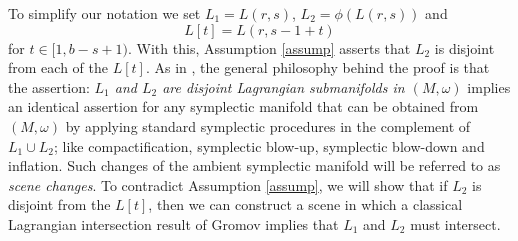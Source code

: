 \documentclass[12pt]{amsart}
\newtheorem{lemma}[theorem]{Lemma}
\theoremstyle{definition}
\begin{document}
To simplify our notation we set $L_1=L(r,s)$, $L_2= \phi(L(r,s))$ and $$L[t] = L(r, s-1+t)$$ for $t \in [1,b-s+1)$. With this, Assumption \ref{assump} asserts that $L_2$ is  disjoint from each of the $L[t]$. As in \cite{hiker}, the general philosophy behind the proof is that the assertion: {\em $L_1$ and $L_2$ are disjoint Lagrangian submanifolds in $(M,\omega)$} implies an identical assertion for any symplectic manifold that can be obtained from $(M,\omega)$ by applying standard symplectic procedures in the complement of $L_1 \cup L_2$; like compactification, symplectic blow-up, symplectic blow-down and inflation. Such changes of the ambient symplectic manifold will be referred to as {\em scene changes}. To contradict Assumption \ref{assump}, we will show that if $L_2$ is disjoint from the $L[t]$, then we can construct a scene in which a classical Lagrangian intersection result of Gromov implies that $L_1$ and $L_2$ must intersect.  







\end{document}
